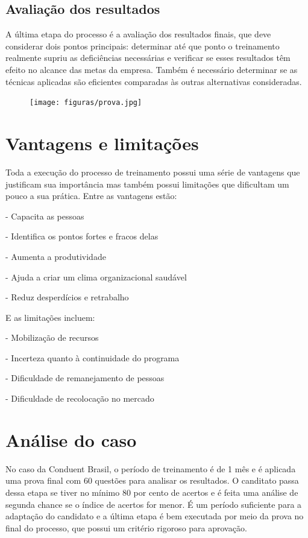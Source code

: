 \documentclass[12pt]{article}
\begin{document}
\subsection{Avaliação dos resultados}
A última etapa do processo é a avaliação dos resultados finais, que deve considerar dois pontos principais: determinar até que ponto o treinamento realmente supriu as deficiências necessárias e verificar se esses resultados têm efeito no alcance das metas da empresa. Também é necessário determinar se as técnicas aplicadas são eficientes comparadas às outras alternativas consideradas.

\begin{figure}[h]

\centering
\texttt{[image: figuras/prova.jpg]}
\end{figure}

\section{Vantagens e limitações}
Toda a execução do processo de treinamento possui uma série de vantagens que justificam sua importância mas também possui limitações que dificultam um pouco a sua prática. 
Entre as vantagens estão:

- Capacita as pessoas

- Identifica os pontos fortes e fracos delas

- Aumenta a produtividade

- Ajuda a criar um clima organizacional saudável

- Reduz desperdícios e retrabalho

E as limitações incluem:

- Mobilização de recursos

- Incerteza quanto à continuidade do programa

- Dificuldade de remanejamento de pessoas

- Dificuldade de recolocação no mercado




\section{Análise do caso}
No caso da Conduent Brasil, o período de treinamento é de 1 mês e é aplicada uma prova final com 60 questões para analisar os resultados. O canditato passa dessa etapa se tiver no mínimo 80 por cento de acertos e é feita uma análise de segunda chance se o índice de acertos for menor. É um período suficiente para a adaptação do candidato e a última etapa é bem executada por meio da prova no final do processo, que possui um critério rigoroso para aprovação.
\end{document}
